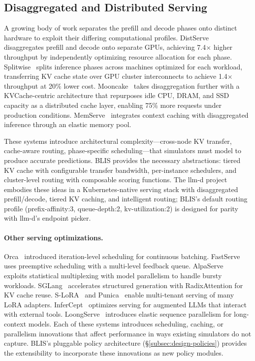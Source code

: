 \documentclass[11pt]{article}
\theoremstyle{plain} %
\theoremstyle{definition} %
\theoremstyle{remark} %
\numberwithin{equation}{section}
\begin{document}
\subsection{Disaggregated and Distributed Serving}
\label{subsec:bg-disagg}

A growing body of work separates the prefill and decode phases onto distinct hardware to exploit their differing computational profiles.
DistServe~\cite{zhong2024distserve} disaggregates prefill and decode onto separate GPUs, achieving 7.4$\times$ higher throughput by independently optimizing resource allocation for each phase.
Splitwise~\cite{patel2024splitwise} splits inference phases across machines optimized for each workload, transferring KV cache state over GPU cluster interconnects to achieve 1.4$\times$ throughput at 20\% lower cost.
Mooncake~\cite{qin2024mooncake} takes disaggregation further with a KVCache-centric architecture that repurposes idle CPU, DRAM, and SSD capacity as a distributed cache layer, enabling 75\% more requests under production conditions.
MemServe~\cite{hu2024memserve} integrates context caching with disaggregated inference through an elastic memory pool.

These systems introduce architectural complexity---cross-node KV transfer, cache-aware routing, phase-specific scheduling---that simulators must model to produce accurate predictions.
BLIS provides the necessary abstractions: tiered KV cache with configurable transfer bandwidth, per-instance schedulers, and cluster-level routing with composable scoring functions.
The llm-d project~\cite{llmd2024} embodies these ideas in a Kubernetes-native serving stack with disaggregated prefill/decode, tiered KV caching, and intelligent routing; BLIS's default routing profile (prefix-affinity:3, queue-depth:2, kv-utilization:2) is designed for parity with llm-d's endpoint picker.

\paragraph{Other serving optimizations.}
Orca~\cite{yu2022orca} introduced iteration-level scheduling for continuous batching.
FastServe~\cite{wu2023fastserve} uses preemptive scheduling with a multi-level feedback queue.
AlpaServe~\cite{li2023alpaserve} exploits statistical multiplexing with model parallelism to handle bursty workloads.
SGLang~\cite{zheng2023sglang} accelerates structured generation with RadixAttention for KV cache reuse.
S-LoRA~\cite{sheng2023slora} and Punica~\cite{chen2023punica} enable multi-tenant serving of many LoRA adapters.
InferCept~\cite{abhyankar2024infercept} optimizes serving for augmented LLMs that interact with external tools.
LoongServe~\cite{wu2024loongserve} introduces elastic sequence parallelism for long-context models.
Each of these systems introduces scheduling, caching, or parallelism innovations that affect performance in ways existing simulators do not capture.
BLIS's pluggable policy architecture (\S\ref{subsec:design-policies}) provides the extensibility to incorporate these innovations as new policy modules.
\end{document}
